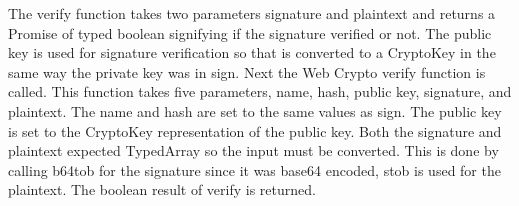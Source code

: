 The verify function takes two parameters signature and plaintext and returns a Promise of typed boolean signifying if the signature verified or not. The public key is used for signature verification so that is converted to a CryptoKey in the same way the private key was in sign. Next the Web Crypto verify function is called. This function takes five parameters, name, hash, public key, signature, and plaintext. The name and hash are set to the same values as sign. The public key is set to the CryptoKey representation of the public key. Both the signature and plaintext expected TypedArray so the input must be converted. This is done by calling b64tob for the signature since it was base64 encoded, stob is used for the plaintext. The boolean result of verify is returned.
 





